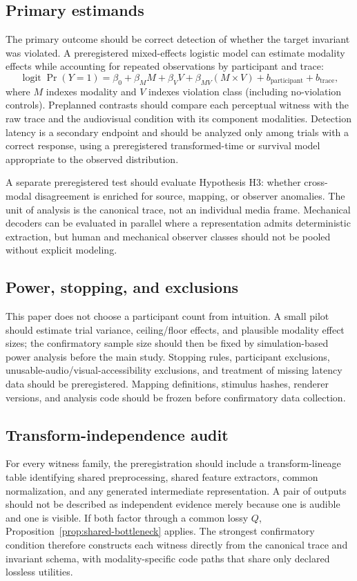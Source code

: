 \documentclass[11pt]{article}
\begin{document}
\subsection{Primary estimands}
The primary outcome should be correct detection of whether the target invariant was violated. A preregistered mixed-effects logistic model can estimate modality effects while accounting for repeated observations by participant and trace:
\begin{equation}
\operatorname{logit}\Pr(Y=1)
= \beta_0 + \beta_M M + \beta_V V + \beta_{MV}(M\!\times\!V)
+ b_{\mathrm{participant}} + b_{\mathrm{trace}},
\end{equation}
where $M$ indexes modality and $V$ indexes violation class (including no-violation controls). Preplanned contrasts should compare each perceptual witness with the raw trace and the audiovisual condition with its component modalities. Detection latency is a secondary endpoint and should be analyzed only among trials with a correct response, using a preregistered transformed-time or survival model appropriate to the observed distribution.

A separate preregistered test should evaluate Hypothesis H3: whether cross-modal disagreement is enriched for source, mapping, or observer anomalies. The unit of analysis is the canonical trace, not an individual media frame. Mechanical decoders can be evaluated in parallel where a representation admits deterministic extraction, but human and mechanical observer classes should not be pooled without explicit modeling.

\subsection{Power, stopping, and exclusions}
This paper does not choose a participant count from intuition. A small pilot should estimate trial variance, ceiling/floor effects, and plausible modality effect sizes; the confirmatory sample size should then be fixed by simulation-based power analysis before the main study. Stopping rules, participant exclusions, unusable-audio/visual-accessibility exclusions, and treatment of missing latency data should be preregistered. Mapping definitions, stimulus hashes, renderer versions, and analysis code should be frozen before confirmatory data collection.

\subsection{Transform-independence audit}
For every witness family, the preregistration should include a transform-lineage table identifying shared preprocessing, shared feature extractors, common normalization, and any generated intermediate representation. A pair of outputs should not be described as independent evidence merely because one is audible and one is visible. If both factor through a common lossy $Q$, Proposition~\ref{prop:shared-bottleneck} applies. The strongest confirmatory condition therefore constructs each witness directly from the canonical trace and invariant schema, with modality-specific code paths that share only declared lossless utilities.
\end{document}
